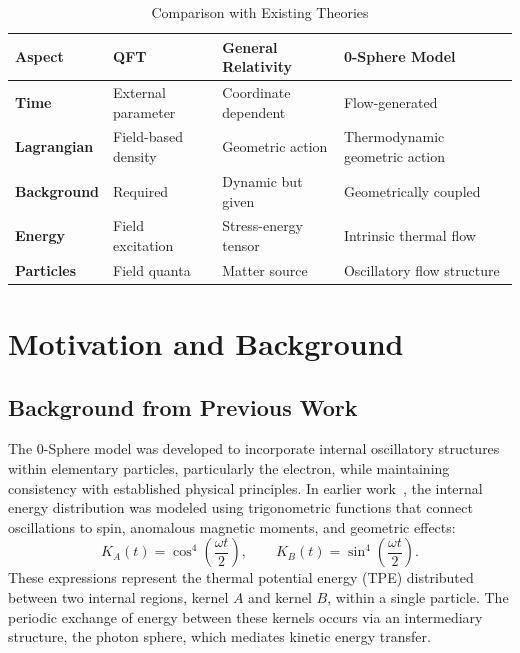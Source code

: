\documentclass[%
 reprint,
 amsmath,amssymb,
 aps,
]{revtex4-1}
\numberwithin{equation}{section}%
\begin{document}
\begin{table}[!htbp]
\caption{Comparison with Existing Theories}
\label{tab:theory_comparison}
\renewcommand{\arraystretch}{1.4}
\begin{tabular}{p{3.2cm}p{4.2cm}p{4.2cm}p{4.8cm}}
\toprule
\textbf{Aspect} & \textbf{QFT} & \textbf{General Relativity} & \textbf{0-Sphere Model} \\
\midrule
\textbf{Time} & External parameter & Coordinate dependent & Flow-generated \\
\addlinespace[0.2cm]
\textbf{Lagrangian} & Field-based density & Geometric action & Thermodynamic geometric action \\
\addlinespace[0.2cm]
\textbf{Background} & Required & Dynamic but given & Geometrically coupled \\
\addlinespace[0.2cm]
\textbf{Energy} & Field excitation & Stress-energy tensor & Intrinsic thermal flow \\
\addlinespace[0.2cm]
\textbf{Particles} & Field quanta & Matter source & Oscillatory flow structure \\
\bottomrule
\end{tabular}
\end{table}


\section{Motivation and Background}
\label{sec:Motivation}

\subsection{Background from Previous Work}

The 0-Sphere model was developed to incorporate internal oscillatory structures within elementary particles, particularly the electron, while maintaining consistency with established physical principles. In earlier work~\cite{hanamura2309.0047, hanamura2506.0031}, the internal energy distribution was modeled using trigonometric functions that connect oscillations to spin, anomalous magnetic moments, and geometric effects:
\begin{equation} \label{eq:kernel_energy}
K_A(t) = \cos^4\left(\frac{\omega t}{2}\right), \qquad K_B(t) = \sin^4\left(\frac{\omega t}{2}\right).
\end{equation}
These expressions represent the thermal potential energy (TPE) distributed between two internal regions, kernel $A$ and kernel $B$, within a single particle. The periodic exchange of energy between these kernels occurs via an intermediary structure, the photon sphere, which mediates kinetic energy transfer.
\end{document}
